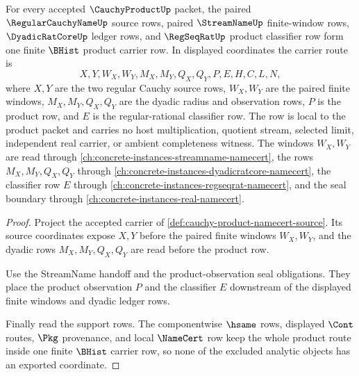 \begin{theorem}
\label{thm:cauchy-product-root-regular-product-carrier-row}
For every accepted $\CauchyProductUp$ packet, the paired $\RegularCauchyNameUp$ source rows, paired $\StreamNameUp$ finite-window rows, $\DyadicRatCoreUp$ ledger rows, and $\RegSeqRatUp$ product classifier row form one finite $\BHist$ product carrier row. In displayed coordinates the carrier route is
$$
X,Y,W_X,W_Y,M_X,M_Y,Q_X,Q_Y,P,E,H,C,L,N,
$$
where $X,Y$ are the two regular Cauchy source rows, $W_X,W_Y$ are the paired finite windows, $M_X,M_Y,Q_X,Q_Y$ are the dyadic radius and observation rows, $P$ is the product row, and $E$ is the regular-rational classifier row. The row is local to the product packet and carries no host multiplication, quotient stream, selected limit, independent real carrier, or ambient completeness witness.
The windows $W_X,W_Y$ are read through \autoref{ch:concrete-instances-streamname-namecert}, the rows $M_X,M_Y,Q_X,Q_Y$ through \autoref{ch:concrete-instances-dyadicratcore-namecert}, the classifier row $E$ through \autoref{ch:concrete-instances-regseqrat-namecert}, and the seal boundary through \autoref{ch:concrete-instances-real-namecert}.
\end{theorem}
\begin{proof}
Project the accepted carrier of \autoref{def:cauchy-product-namecert-source}. Its source coordinates expose $X,Y$ before the paired finite windows $W_X,W_Y$, and the dyadic rows $M_X,M_Y,Q_X,Q_Y$ are read before the product row.

Use the StreamName handoff and the product-observation seal obligations. They place the product observation $P$ and the classifier $E$ downstream of the displayed finite windows and dyadic ledger rows.

Finally read the support rows. The componentwise $\hsame$ rows, displayed $\Cont$ routes, $\Pkg$ provenance, and local $\NameCert$ row keep the whole product route inside one finite $\BHist$ carrier row, so none of the excluded analytic objects has an exported coordinate.
\end{proof}

